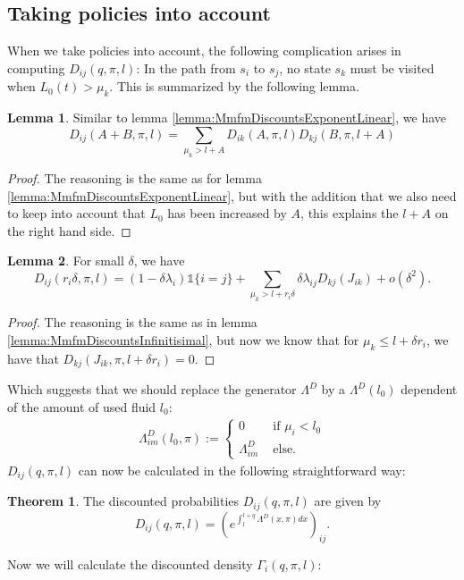 \documentclass[a4paper]{thesis}
\theoremstyle{definition}
\newtheorem{theorem}{Theorem}[chapter]
\newtheorem{lemma}{Lemma}[chapter]
\begin{document}
\subsection{Taking policies into account}
When we take policies into account, the following complication arises in computing $D_{ij}(q, \pi,l)$:
In the path from $s_i$ to $s_j$, no state $s_k$ must be visited when $L_0(t)>\mu_k$.
This is summarized by the following lemma.
\begin{lemma}
	Similar to lemma \ref{lemma:MmfmDiscountsExponentLinear}, we have
	\[
	D_{ij}(A+B,\pi,l)=\sum\limits_{\mu_k>l+A} D_{ik}(A,\pi,l)D_{kj}(B,\pi,l+A)
	\]
	\begin{proof}
		The reasoning is the same as for lemma \ref{lemma:MmfmDiscountsExponentLinear}, but with the addition that we also need to keep into account that $L_0$ has been increased by $A$, this explains the $l+A$ on the right hand side.
	\end{proof}
\end{lemma}

\begin{lemma}
	For small $\delta$, we have
	\[
	D_{ij}(r_i\delta,\pi,l)=(1-\delta\lambda_i)\mathds{1}\{i=j\}+\sum\limits_{\mu_k>l+r_i\delta}\delta\lambda_{ij}D_{kj}(J_{ik})+o(\delta^2).
	\]
	\begin{proof}
		The reasoning is the same as in lemma \ref{lemma:MmfmDiscountsInfinitisimal}, but now we know that for $\mu_k\leq l+\delta r_i$, we have that $D_{kj}(J_{ik},\pi,l+\delta r_i)=0$.
	\end{proof}
\end{lemma}
Which suggests that we should replace the generator $\Lambda^D$ by a $\Lambda^D(l_0)$ dependent of the amount of used fluid $l_0$:
\begin{equation}
\begin{split}
\Lambda^D_{im}(l_0,\pi):=\begin{cases}
0&\text{ if }\mu_i<l_0\\
\Lambda^D_{im}&\text{ else.}
\end{cases}
\end{split}
\end{equation}
$D_{ij}(q, \pi,l)$ can now be calculated in the following straightforward way:
\begin{theorem}
	The discounted probabilities $D_{ij}(q, \pi,l)$ are given by
	\[
	D_{ij}(q, \pi,l)=\left(e^{\int_l^{l+q}\Lambda^D(x,\pi)dx}\right)_{ij}.
	\]
\end{theorem}
Now we will calculate the discounted density $\Gamma_i(q,\pi,l)$:
\end{document}

